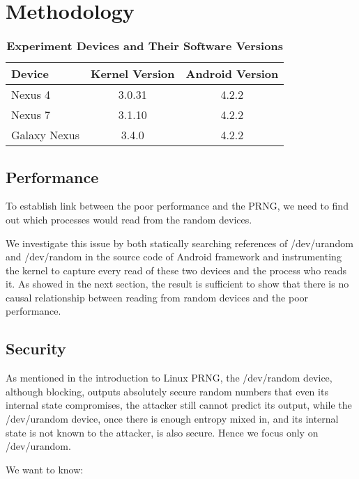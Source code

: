 \section{Methodology}

\begin{table}
\begin{center}
\begin{tabular}{|l|c|c|}
\hline
\bf Device & \bf Kernel Version & \bf Android Version \\
\hline
Nexus 4 & 3.0.31 & 4.2.2 \\
\hline
Nexus 7 & 3.1.10 & 4.2.2 \\
\hline
Galaxy Nexus & 3.4.0 & 4.2.2 \\
\hline

\end{tabular}
\end{center}
\caption{{\bf Experiment Devices and Their Software Versions} }
\label{tbldevice}
\end{table}


\subsection{Performance}

To establish link between the poor performance and the PRNG, we need to find out which processes would read from the random devices.

We investigate this issue by both statically searching references of /dev/urandom and /dev/random in the source code of Android framework and instrumenting the kernel to capture every read of these two devices and the process who reads it. As showed in the next section, the result is sufficient to show that there is no causal relationship between reading from random devices and the poor performance.

\subsection{Security}

As mentioned in the introduction to Linux PRNG, the /dev/random device, although blocking, outputs absolutely secure random numbers that even its internal state compromises, the attacker still cannot predict its output, while the /dev/urandom device, once there is enough entropy mixed in, and its internal state is not known to the attacker, is also secure. Hence we focus only on /dev/urandom.

We want to know:

